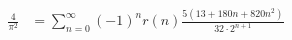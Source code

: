 \documentclass[preview]{standalone}
\begin{document}
\begin{align*}
\frac{4}{\pi^2} &= \sum_{n=0}^{\infty} (-1)^n r(n) \frac{5(13 + 180n + 820n^2)}{32 \cdot 2^{n+1}} \\
\end{align*}
\end{document}
